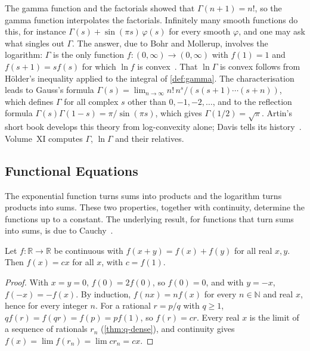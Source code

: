\begin{note}{The gamma function and the factorials}
 showed that $\Gamma(n+1)=n!$, so the gamma function interpolates the factorials. Infinitely many smooth functions do this, for instance $\Gamma(s)+\sin(\pi s)\,\varphi(s)$ for every smooth $\varphi$, and one may ask what singles out $\Gamma$. The answer, due to Bohr and Mollerup, involves the logarithm: $\Gamma$ is the only function $f\colon(0,\infty)\to(0,\infty)$ with $f(1)=1$ and $f(s+1)=sf(s)$ for which $\ln f$ is convex~\cite{artin1964gamma}. That $\ln\Gamma$ is convex follows from H\"older's inequality applied to the integral of \cref{def:gamma}. The characterisation leads to Gauss's formula $\Gamma(s)=\lim_{n\to\infty}n!\,n^s/(s(s+1)\cdots(s+n))$, which defines $\Gamma$ for all complex $s$ other than $0,-1,-2,\ldots$, and to the reflection formula $\Gamma(s)\Gamma(1-s)=\pi/\sin(\pi s)$, which gives $\Gamma(1/2)=\sqrt\pi$. Artin's short book develops this theory from log-convexity alone; Davis tells its history~\cite{artin1964gamma,davis1959gamma}. Volume~XI computes $\Gamma$, $\ln\Gamma$ and their relatives.
\end{note}

\subsection{Functional Equations}

The exponential function turns sums into products and the logarithm turns products into sums. These two properties, together with continuity, determine the functions up to a constant. The underlying result, for functions that turn sums into sums, is due to Cauchy~\cite{cauchy1821}.

\begin{theorem}
\label{thm:cauchy-functional}
Let $f\colon\mathbb R\to\mathbb R$ be continuous with $f(x+y)=f(x)+f(y)$ for all real $x,y$. Then $f(x)=cx$ for all $x$, with $c=f(1)$.
\end{theorem}

\begin{proof}
With $x=y=0$, $f(0)=2f(0)$, so $f(0)=0$, and with $y=-x$, $f(-x)=-f(x)$. By induction, $f(nx)=nf(x)$ for every $n\in\mathbb N$ and real $x$, hence for every integer $n$. For a rational $r=p/q$ with $q\ge1$, $qf(r)=f(qr)=f(p)=pf(1)$, so $f(r)=cr$. Every real $x$ is the limit of a sequence of rationals $r_n$ (\cref{thm:q-dense}), and continuity gives $f(x)=\lim f(r_n)=\lim cr_n=cx$.
\end{proof}

